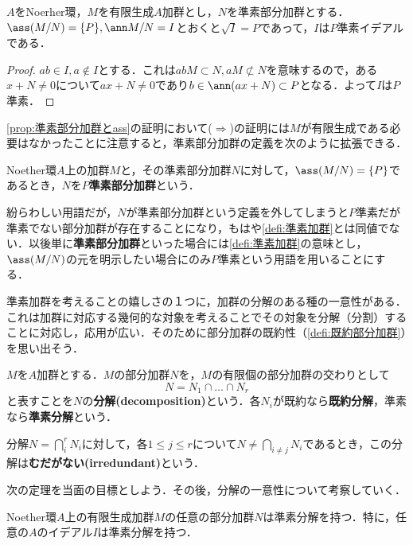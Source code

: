 \begin{prop}
	$A$をNoerher環，$M$を有限生成$A$加群とし，$N$を準素部分加群とする．$\ass (M/N)=\{P\},\ann M/N=I$とおくと$\sqrt{I}=P$であって，$I$は$P$準素イデアルである．
\end{prop}

\begin{proof}
	$ab\in I,a\not\in I$とする．これは$abM\subset N,aM\not\subset N$を意味するので，ある$x+N\neq0$について$ax+N\neq0$であり$b\in\ann (ax+N)\subset P$となる．よって$I$は$P$準素．
\end{proof}

\ref{prop:準素部分加群とass}の証明において($\Longrightarrow$)の証明には$M$が有限生成である必要はなかったことに注意すると，準素部分加群の定義を次のように拡張できる．

\begin{defi}
	Noether環$A$上の加群$M$と，その準素部分加群$N$に対して，$\ass(M/N)=\{P\}$であるとき，$N$を$P$\textbf{準素部分加群}という．
\end{defi}

紛らわしい用語だが，$N$が準素部分加群という定義を外してしまうと$P$準素だが準素でない部分加群が存在することになり，もはや\ref{defi:準素加群}とは同値でない．以後単に\textbf{準素部分加群}といった場合には\ref{defi:準素加群}の意味とし，$\ass(M/N)$の元を明示したい場合にのみ$P$準素という用語を用いることにする．

準素加群を考えることの嬉しさの１つに，加群の分解のある種の一意性がある．これは加群に対応する幾何的な対象を考えることでその対象を分解（分割）することに対応し，応用が広い．そのために部分加群の既約性（\ref{defi:既約部分加群}）を思い出そう．

\begin{defi}
	$M$を$A$加群とする．$M$の部分加群$N$を，$M$の有限個の部分加群の交わりとして
	\[N=N_1\cap\dots\cap N_r\]
	と表すことを$N$の\textbf{分解(decomposition)}という．各$N_i$が既約なら\textbf{既約分解}，準素なら\textbf{準素分解}という．
\end{defi}

分解$N=\bigcap_{i}^r N_i$に対して，各$1\leq j\leq r$について$N\neq \bigcap_{i\neq j}N_i$であるとき，この分解は\textbf{むだがない(irredundant)}という．

次の定理を当面の目標としよう．その後，分解の一意性について考察していく．

\begin{thm}\label{thm:Laker-Noetherの分解定理}
	Noether環$A$上の有限生成加群$M$の任意の部分加群$N$は準素分解を持つ．特に，任意の$A$のイデアル$I$は準素分解を持つ．
\end{thm}

